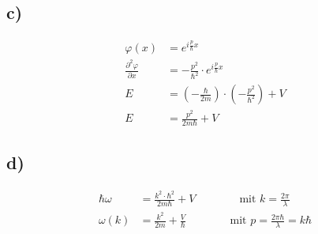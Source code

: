 \subsection{c)}

    \begin{align}
        \varphi(x) &= e^{i \frac{p}{\hbar} x}\\
        \frac{\partial^2 \varphi}{\partial x} &= - \frac{p^2}{\hbar^2} \cdot e^{i \frac{p}{\hbar} x}\\
        E &= (- \frac{\hbar}{2m}) \cdot (- \frac{p^2}{\hbar^2}) + V\\
        E &= \frac{p^2}{2m \hbar} + V
    \end{align}

\subsection{d)}

    \begin{align}
        \hbar \omega &= \frac{k^2 \cdot \hbar^2}{2m\hbar} + V \qquad \qquad \text{mit $k = \frac{2\pi}{\lambda}$}\\
        \omega(k) &= \frac{k^2}{2m} + \frac{V}{\hbar} \qquad \qquad \text{mit $p = \frac{2\pi \hbar}{\lambda} = k\hbar$}
    \end{align}

